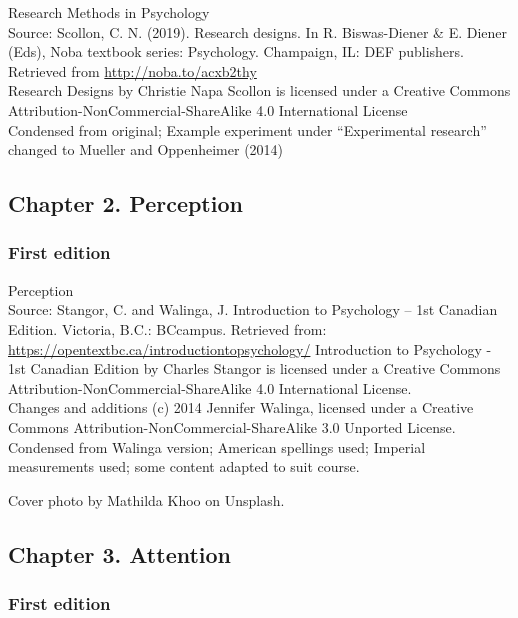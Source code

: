 \documentclass[
]{krantz}
\begin{document}
Research Methods in Psychology\\
Source: Scollon, C. N. (2019). Research designs. In R. Biswas-Diener \& E. Diener (Eds), Noba textbook series: Psychology. Champaign, IL: DEF publishers. Retrieved from \url{http://noba.to/acxb2thy}\\
Research Designs by Christie Napa Scollon is licensed under a Creative Commons Attribution-NonCommercial-ShareAlike 4.0 International License\\
Condensed from original; Example experiment under ``Experimental research'' changed to Mueller and Oppenheimer (2014)

\hypertarget{chapter-2.-perception}{%
\subsection*{Chapter 2. Perception}\label{chapter-2.-perception}}


\hypertarget{first-edition-2}{%
\subsubsection*{First edition}\label{first-edition-2}}


Perception\\
Source: Stangor, C. and Walinga, J. Introduction to Psychology -- 1st Canadian Edition. Victoria, B.C.: BCcampus. Retrieved from: \url{https://opentextbc.ca/introductiontopsychology/}
Introduction to Psychology - 1st Canadian Edition by Charles Stangor is licensed under a Creative Commons Attribution-NonCommercial-ShareAlike 4.0 International License.\\
Changes and additions (c) 2014 Jennifer Walinga, licensed under a Creative Commons Attribution-NonCommercial-ShareAlike 3.0 Unported License.\\
Condensed from Walinga version; American spellings used; Imperial measurements used; some content adapted to suit course.

Cover photo by Mathilda Khoo on Unsplash.

\hypertarget{chapter-3.-attention}{%
\subsection*{Chapter 3. Attention}\label{chapter-3.-attention}}


\hypertarget{first-edition-3}{%
\subsubsection*{First edition}\label{first-edition-3}}
\end{document}

